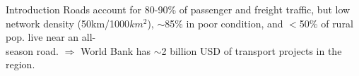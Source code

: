 \documentclass[aspectratio=169,xcolor=dvipsnames]{beamer}
\begin{document}
\begin{frame}{Introduction}
Roads account for 80-90\% of passenger and freight traffic, but low network density (50km/1000$km^2$), $\sim$85\% in poor condition, and $<$50\% of rural pop. live near an all-\\season road. $\Rightarrow$ World Bank has $\sim$2 billion USD of transport projects in the region. \\ \vspace{2mm}    
\end{frame}
\end{document}
